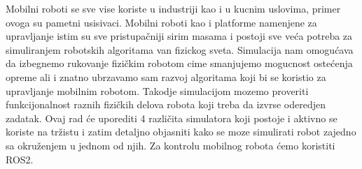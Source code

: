 Mobilni roboti se sve vise koriste u industriji kao i u kucnim uslovima,
primer ovoga su pametni usisivaci. %
\newline
Mobilni roboti kao i platforme namenjene za upravljanje istim
su sve pristupačniji sirim masama i postoji sve veća potreba za simuliranjem
robotskih algoritama van fizickog sveta. 
\newline
Simulacija nam omogućava da izbegnemo rukovanje fizičkim robotom cime
smanjujemo mogucnost ostećenja opreme ali i znatno ubrzavamo sam razvoj
algoritama koji bi se koristio za upravljanje mobilnim robotom. Takodje simulacijom
mozemo proveriti funkcijonalnost raznih fizičkih delova robota koji treba da izvrse oderedjen
zadatak.
\newline
Ovaj rad će uporediti 4 različita simulatora koji postoje i aktivno se 
koriste na tržistu i zatim detaljno objasniti kako se moze simulirati robot
zajedno sa okruženjem u jednom od njih.
\newline
Za kontrolu mobilnog robota ćemo koristiti ROS2. 
